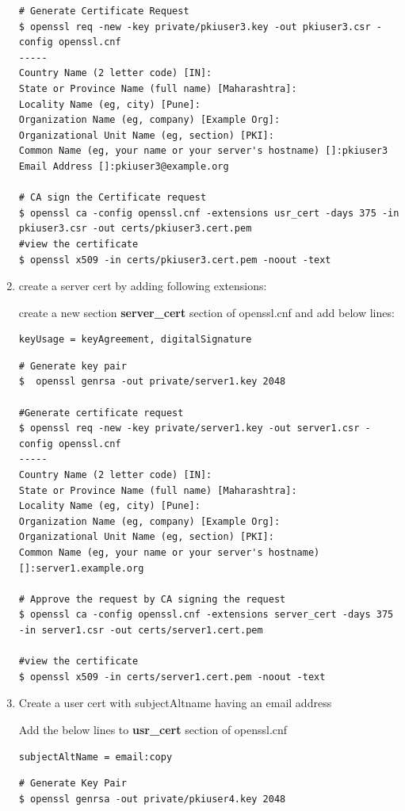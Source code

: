 \documentclass[a4paper]{article}
\begin{document}
\begin{enumerate}[label*=\arabic*.]
\begin{lstlisting}[style=bashInputStyle]
# Generate Certificate Request
$ openssl req -new -key private/pkiuser3.key -out pkiuser3.csr -config openssl.cnf
-----
Country Name (2 letter code) [IN]:
State or Province Name (full name) [Maharashtra]:
Locality Name (eg, city) [Pune]:
Organization Name (eg, company) [Example Org]:
Organizational Unit Name (eg, section) [PKI]:
Common Name (eg, your name or your server's hostname) []:pkiuser3
Email Address []:pkiuser3@example.org

# CA sign the Certificate request 
$ openssl ca -config openssl.cnf -extensions usr_cert -days 375 -in pkiuser3.csr -out certs/pkiuser3.cert.pem
#view the certificate
$ openssl x509 -in certs/pkiuser3.cert.pem -noout -text
        \end{lstlisting}

    \item create a server cert by adding following extensions:

        create a new section \textbf{server\_cert} section of openssl.cnf and add below lines:
        \begin{lstlisting}
keyUsage = keyAgreement, digitalSignature
        \end{lstlisting}
        \begin{lstlisting}[style=bashInputStyle]
# Generate key pair
$  openssl genrsa -out private/server1.key 2048        

#Generate certificate request
$ openssl req -new -key private/server1.key -out server1.csr -config openssl.cnf
-----
Country Name (2 letter code) [IN]:
State or Province Name (full name) [Maharashtra]:
Locality Name (eg, city) [Pune]:
Organization Name (eg, company) [Example Org]:
Organizational Unit Name (eg, section) [PKI]:
Common Name (eg, your name or your server's hostname) []:server1.example.org

# Approve the request by CA signing the request
$ openssl ca -config openssl.cnf -extensions server_cert -days 375 -in server1.csr -out certs/server1.cert.pem

#view the certificate
$ openssl x509 -in certs/server1.cert.pem -noout -text
        \end{lstlisting}
    
    \item Create a user cert with subjectAltname having an email address

        Add the below lines to \textbf{usr\_cert} section of openssl.cnf
        \begin{lstlisting}
subjectAltName = email:copy
        \end{lstlisting}
        \begin{lstlisting}[style=bashInputStyle]
# Generate Key Pair
$ openssl genrsa -out private/pkiuser4.key 2048        


\end{lstlisting}
\end{enumerate}
\end{document}
